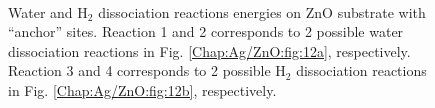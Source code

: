 \begingroup
\begin{figure}[!ht]
  \centering
  \label{Chap:Ag/ZnO:fig:13a}
  \label{Chap:Ag/ZnO:fig:13b}
  \\
  \label{Chap:Ag/ZnO:fig:13c}
  \label{Chap:Ag/ZnO:fig:13d}
\caption[Water and $\text{H}_{\text{2}}$ dissociation reactions energies on ZnO substrate with ``anchor'' sites.]{Water and $\text{H}_{\text{2}}$ dissociation reactions energies on ZnO substrate with ``anchor'' sites. Reaction 1 and 2 corresponds to 2 possible water dissociation reactions in Fig.
\ref{Chap:Ag/ZnO:fig:12a}, respectively. Reaction 3 and 4 corresponds to 2 possible $\text{H}_{\text{2}}$ dissociation reactions in Fig. \ref{Chap:Ag/ZnO:fig:12b}, respectively.}
\label{Chap:Ag/ZnO:fig13}
\end{figure}
\endgroup

